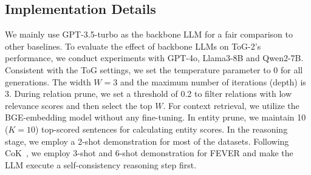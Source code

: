 \documentclass{article} %
\begin{document}
\subsection{Implementation Details}
We mainly use GPT-3.5-turbo as the backbone LLM for a fair comparison to other baselines. To evaluate the effect of backbone LLMs on ToG-2's performance, we conduct experiments with GPT-4o, Llama3-8B and Qwen2-7B.
Consistent with the ToG settings, we set the temperature parameter to 0 for all generations. The width $W = 3$ and the maximum number of iterations (depth) is $3$. During relation prune, we set a threshold of 0.2 to filter relations with low relevance scores and then select the top $W$. For context retrieval, we utilize the BGE-embedding model without any fine-tuning. In entity prune, we maintain 10 ($K = 10$) top-scored sentences for calculating entity scores.
In the reasoning stage, we employ a 2-shot demonstration for most of the datasets. Following CoK~\citep{li2024cok}, we employ 3-shot and 6-shot demonstration for FEVER and make the LLM execute a self-consistency reasoning step first. 
\end{document}
